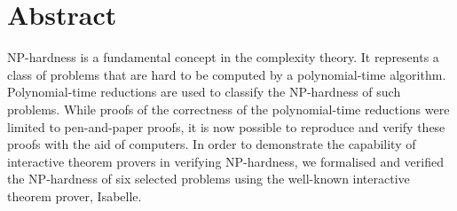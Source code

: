 \newcommand{\abstractname}{Abstract}


\chapter{\abstractname}
NP-hardness is a fundamental concept in the complexity theory. It represents a class of problems that 
are hard to be computed by a polynomial-time algorithm. Polynomial-time reductions are used 
to classify the NP-hardness of such problems. While proofs of the correctness of the polynomial-time reductions 
were limited to pen-and-paper proofs, 
it is now possible to reproduce and verify these proofs with the aid of computers. 
In order to demonstrate the capability of interactive theorem provers in verifying NP-hardness, 
we formalised and verified the NP-hardness of six selected problems using 
the well-known interactive theorem prover, Isabelle.